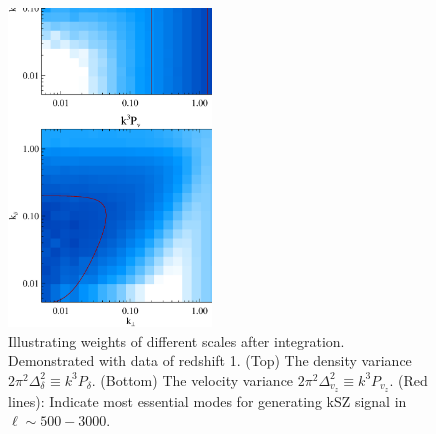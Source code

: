 \begin{figure}[tbp]
\begin{center}
\includegraphics[width=0.48\textwidth]{figure/k3pd_k3pv_z1.eps}
\end{center}
\vspace{-0.7cm}
\caption{
    Illustrating weights of different scales after integration. 
    Demonstrated with data of redshift 1.
    (Top) The density variance $2\pi^2\Delta_\delta^2\equiv k^3P_\delta$. 
    (Bottom) The velocity variance $2\pi^2\Delta_{v_z}^2\equiv k^3P_{v_z}$. 
    (Red lines): Indicate most essential modes for generating kSZ signal in 
    $\ell\sim 500-3000$.
}
\label{fig:k3v}
\end{figure}

